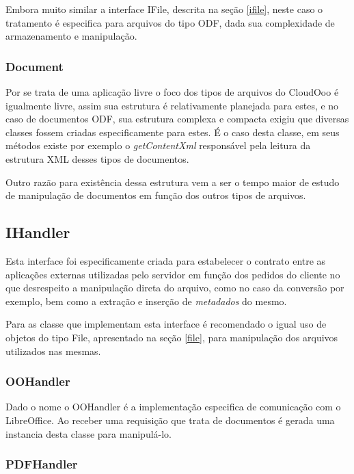 Embora muito similar a interface IFile, descrita na seção \ref{ifile}, neste caso o tratamento é especifica para arquivos do tipo ODF, dada sua complexidade de armazenamento e manipulação.

\subsubsection{Document}

Por se trata de uma aplicação livre o foco dos tipos de arquivos do CloudOoo é igualmente livre, assim sua estrutura é relativamente planejada para estes, e no caso de documentos ODF, sua estrutura complexa e compacta exigiu que diversas classes fossem criadas especificamente para estes. É o caso desta classe, em seus métodos existe por exemplo o \textit{getContentXml} responsável pela leitura da estrutura XML desses tipos de documentos.

Outro razão para existência dessa estrutura vem a ser o tempo maior de estudo de manipulação de documentos em função dos outros tipos de arquivos.

\subsection{IHandler}
\label{ihandler}

Esta interface foi especificamente criada para estabelecer o contrato entre as aplicações externas utilizadas pelo servidor em função dos pedidos do cliente no que desrespeito a manipulação direta do arquivo, como no caso da conversão por exemplo, bem como a extração e inserção de \textit{metadados} do mesmo.

Para as classe que implementam esta interface é recomendado o igual uso de objetos do tipo File, apresentado na seção \ref{file}, para manipulação dos arquivos utilizados nas mesmas.

\subsubsection{OOHandler}

Dado o nome o OOHandler é a implementação especifica de comunicação com o LibreOffice. Ao receber uma requisição que trata de documentos é gerada uma instancia desta classe para manipulá-lo.

\subsubsection{PDFHandler}

